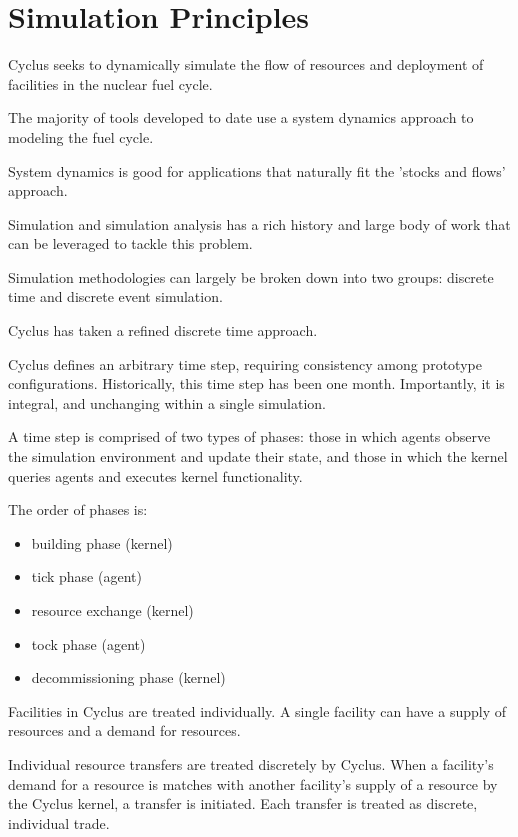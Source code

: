 
\section{Simulation Principles}\label{abm:sim}

Cyclus seeks to dynamically simulate the flow of resources and deployment of
facilities in the nuclear fuel cycle.

The majority of tools developed to date use a system dynamics approach to
modeling the fuel cycle.

System dynamics is good for applications that naturally fit the 'stocks and
flows' approach.

Simulation and simulation analysis has a rich history and large body of work
that can be leveraged to tackle this problem.

Simulation methodologies can largely be broken down into two groups: discrete
time and discrete event simulation. 

Cyclus has taken a refined discrete time approach.

Cyclus defines an arbitrary time step, requiring consistency among prototype
configurations. Historically, this time step has been one month. Importantly, it
is integral, and unchanging within a single simulation.

A time step is comprised of two types of phases: those in which agents observe
the simulation environment and update their state, and those in which the kernel
queries agents and executes kernel functionality.

The order of phases is:

\begin{itemize}
  \item building phase (kernel)
  \item tick phase (agent)
  \item resource exchange (kernel)
  \item tock phase (agent)
  \item decommissioning phase (kernel)
\end{itemize}

Facilities in Cyclus are treated individually. A single facility can have a
supply of resources and a demand for resources. 

Individual resource transfers are treated discretely by Cyclus. When a
facility's demand for a resource is matches with another facility's supply of a
resource by the Cyclus kernel, a transfer is initiated. Each transfer is treated
as discrete, individual trade.
